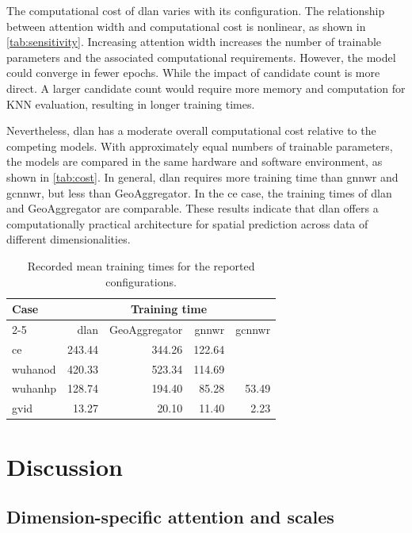 \documentclass[]{interact}
\newcommand{\DLAN}{\gls{dlan}\xspace}
\newcommand{\GNNWR}{\gls{gnnwr}\xspace}
\newcommand{\GCNNWR}{\gls{gcnnwr}\xspace}
\newcommand{\GAgg}{GeoAggregator\xspace}
\newcommand{\COO}{\gls{ce}\xspace}
\newcommand{\WuhanOD}{\gls{wuhanod}\xspace}
\newcommand{\WuhanHP}{\gls{wuhanhp}\xspace}
\newcommand{\GVI}{\gls{gvid}\xspace}
\begin{document}
The computational cost of \DLAN varies with its configuration.
The relationship between attention width and computational cost is nonlinear, as shown in \autoref{tab:sensitivity}.
Increasing attention width increases the number of trainable parameters and the associated computational requirements.
However, the model could converge in fewer epochs.
While the impact of candidate count is more direct.
A larger candidate count would require more memory and computation for KNN evaluation, resulting in longer training times.

Nevertheless, \DLAN has a moderate overall computational cost relative to the competing models.
With approximately equal numbers of trainable parameters,
the models are compared in the same hardware and software environment,
as shown in \autoref{tab:cost}.
In general, \DLAN requires more training time than \GNNWR and \GCNNWR, but less than \GAgg.
In the \COO case, the training times of \DLAN and \GAgg are comparable.
These results indicate that \DLAN offers a computationally practical architecture for spatial prediction
across data of different dimensionalities.

\begin{table}[tb]
  \centering\small
  \caption{
    Recorded mean training times for the reported configurations.
  }\label{tab:cost}
  \begin{tabular}{lrrrr}\toprule
    \multirow{2}{*}{Case}     & \multicolumn{4}{c}{Training time} \\\cmidrule(lr){2-5}
    & \DLAN & \GAgg & \GNNWR & \GCNNWR \\\midrule
    \COO     & 243.44  & 344.26  & 122.64 & \\
    \WuhanOD & 420.33 & 523.34 & 114.69 & \\
    \WuhanHP & 128.74 & 194.40 & 85.28 & 53.49 \\
    \GVI     & 13.27 & 20.10 & 11.40 & 2.23 \\
    \bottomrule
  \end{tabular}
\end{table}

\section{Discussion}\label{sec:discussion}

\subsection{Dimension-specific attention and scales}
\end{document}
